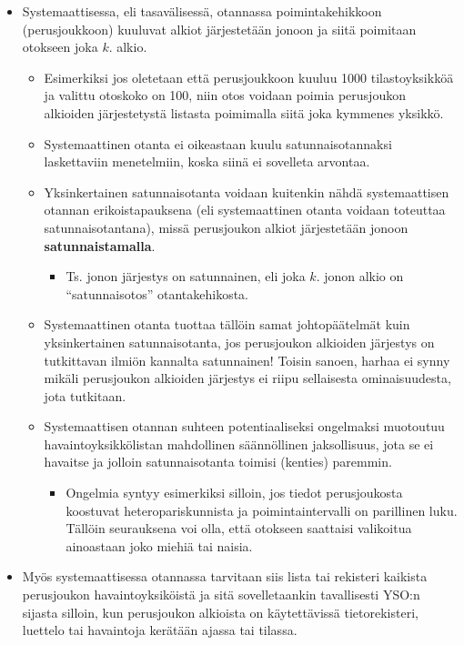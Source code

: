 \documentclass[
]{book}
\providecommand{\tightlist}{%
  \setlength{\itemsep}{0pt}\setlength{\parskip}{0pt}}
\begin{document}
\begin{itemize}
\tightlist
\item
  Systemaattisessa, eli tasavälisessä, otannassa poimintakehikkoon (perusjoukkoon) kuuluvat alkiot järjestetään jonoon ja siitä poimitaan otokseen joka \(k\). alkio.

  \begin{itemize}
  \tightlist
  \item
    Esimerkiksi jos oletetaan että perusjoukkoon kuuluu 1000 tilastoyksikköä ja valittu otoskoko on 100, niin otos voidaan poimia perusjoukon alkioiden järjestetystä listasta poimimalla siitä joka kymmenes yksikkö.
  \item
    Systemaattinen otanta ei oikeastaan kuulu satunnaisotannaksi laskettaviin menetelmiin, koska siinä ei sovelleta arvontaa.
  \item
    Yksinkertainen satunnaisotanta voidaan kuitenkin nähdä systemaattisen otannan erikoistapauksena (eli systemaattinen otanta voidaan toteuttaa satunnaisotantana), missä perusjoukon alkiot järjestetään jonoon \textbf{satunnaistamalla}.

    \begin{itemize}
    \tightlist
    \item
      Ts. jonon järjestys on satunnainen, eli joka \(k\). jonon alkio on ``satunnaisotos'' otantakehikosta.
    \end{itemize}
  \item
    Systemaattinen otanta tuottaa tällöin samat johtopäätelmät kuin yksinkertainen satunnaisotanta, jos perusjoukon alkioiden järjestys on tutkittavan ilmiön kannalta satunnainen! Toisin sanoen, harhaa ei synny mikäli perusjoukon alkioiden järjestys ei riipu sellaisesta ominaisuudesta, jota tutkitaan.
  \item
    Systemaattisen otannan suhteen potentiaaliseksi ongelmaksi muotoutuu havaintoyksikkölistan mahdollinen säännöllinen jaksollisuus, jota se ei havaitse ja jolloin satunnaisotanta toimisi (kenties) paremmin.

    \begin{itemize}
    \tightlist
    \item
      Ongelmia syntyy esimerkiksi silloin, jos tiedot perusjoukosta koostuvat heteropariskunnista ja poimintaintervalli on parillinen luku. Tällöin seurauksena voi olla, että otokseen saattaisi valikoitua ainoastaan joko miehiä tai naisia.
    \end{itemize}
  \end{itemize}
\item
  Myös systemaattisessa otannassa tarvitaan siis lista tai rekisteri kaikista perusjoukon havaintoyksiköistä ja sitä sovelletaankin tavallisesti YSO:n sijasta silloin, kun perusjoukon alkioista on käytettävissä tietorekisteri, luettelo tai havaintoja kerätään ajassa tai tilassa.


\end{itemize}
\end{document}
